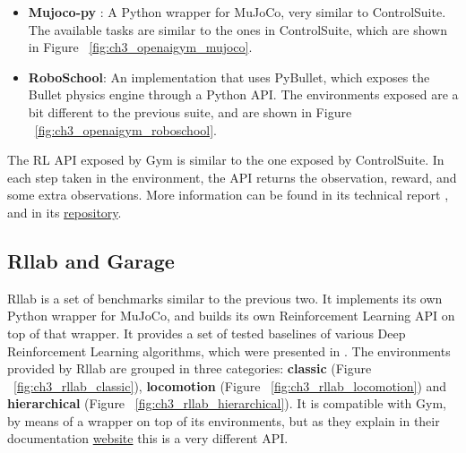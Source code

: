 \begin{itemize}
    \item \textbf{Mujoco-py} : A Python wrapper for MuJoCo, very similar to ControlSuite. 
          The available tasks are similar to the ones in ControlSuite, which are shown 
          in Figure ~\ref{fig:ch3_openaigym_mujoco}.

        \figBenchmarkOpenAIGymMujoco

    \item \textbf{RoboSchool}: An implementation that uses PyBullet, which exposes 
          the Bullet physics engine through a Python API. The environments exposed 
          are a bit different to the previous suite, and are shown in Figure ~\ref{fig:ch3_openaigym_roboschool}. 

        \figBenchmarkOpenAIGymRoboschool

\end{itemize}

The RL API exposed by Gym is similar to the one exposed by ControlSuite. 
In each step taken in the environment, the API returns the observation, 
reward, and some extra observations. More information can be found in its 
technical report \citep{Gym}, and in its \href{https://github.com/openai/gym}{repository}.

\subsection{Rllab and Garage} \label{subsec:ch3_rllab}

Rllab is a set of benchmarks similar to the previous two. It implements its own 
Python wrapper for MuJoCo, and builds its own Reinforcement Learning API on top 
of that wrapper. It provides a set of tested baselines of various Deep Reinforcement 
Learning algorithms, which were presented in \cite{Rllab}. The environments provided 
by Rllab are grouped in three categories: \textbf{classic} (Figure ~\ref{fig:ch3_rllab_classic}), 
\textbf{locomotion} (Figure ~\ref{fig:ch3_rllab_locomotion}) and \textbf{hierarchical} 
(Figure ~\ref{fig:ch3_rllab_hierarchical}). It is compatible with Gym, by means of 
a wrapper on top of its environments, but as they explain in their documentation 
\href{https://rllab.readthedocs.io/en/latest/user/gym_integration.html}{website} 
this is a very different API.

\figBenchmarkRllabClassic

\figBenchmarkRllabLocomotion

\figBenchmarkRllabHierarchical

